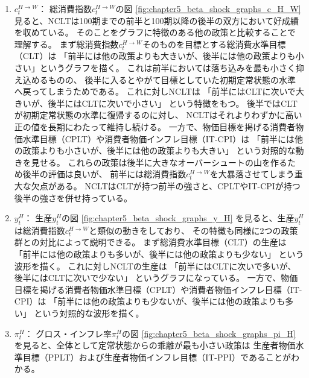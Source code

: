 \begin{enumerate}
    \item
    \label{itm:chapter5_beta_shock_policies_nclt_c_H_W}
        \(c_t^{H\to W}\)：
        総消費指数\(c_t^{H\to W}\)の図
        \ref{fig:chapter5_beta_shock_graphs_c_H_W}
        見ると、NCLTは100期までの前半と100期以降の後半の双方において好成績を収めている。
        そのことをグラフに特徴のある他の政策と比較することで理解する。
        まず総消費指数\(c_t^{H\to W}\)そのものを目標とする総消費水準目標（CLT）は
        「前半には他の政策よりも大きいが、後半には他の政策よりも小さい」というグラフを描く。
        これは前半においては落ち込みを最も小さく抑え込めるものの、
        後半に入るとやがて目標としていた初期定常状態の水準へ戻ってしまうためである。
        これに対しNCLTは
        「前半にはCLTに次いで大きいが、後半にはCLTに次いで小さい」
        という特徴をもつ。
        後半ではCLTが初期定常状態の水準に復帰するのに対し、
        NCLTはそれよりわずかに高い正の値を長期にわたって維持し続ける。
        一方で、物価目標を掲げる消費者物価水準目標（CPLT）や消費者物価インフレ目標（IT-CPI）は
        「前半には他の政策よりも小さいが、後半には他の政策よりも大きい」
        という対照的な動きを見せる。
        これらの政策は後半に大きなオーバーシュートの山を作るため後半の評価は良いが、
        前半には総消費指数\(c_t^{H\to W}\)を大暴落させてしまう重大な欠点がある。
        NCLTはCLTが持つ前半の強さと、CPLTやIT-CPIが持つ後半の強さを併せ持っている。
    \item 
    \label{itm:chapter5_beta_shock_policies_nclt_y_H}
        \(y_t^H\)：
        生産\(y_t^H\)の図
        \ref{fig:chapter5_beta_shock_graphs_y_H}
        を見ると、生産\(y_t^H\)は総消費指数\(c_t^{H\to W}\)と類似の動きをしており、
        その特徴も同様に2つの政策群との対比によって説明できる。
        まず総消費水準目標（CLT）の生産は
        「前半には他の政策よりも多いが、後半には他の政策よりも少ない」
        という波形を描く。
        これに対しNCLTの生産は
        「前半にはCLTに次いで多いが、後半にはCLTに次いで少ない」
        というグラフになっている。
        一方で、物価目標を掲げる消費者物価水準目標（CPLT）や消費者物価インフレ目標（IT-CPI）は
        「前半には他の政策よりも少ないが、後半には他の政策よりも多い」
        という対照的な波形を描く。
    \item 
    \label{itm:chapter5_beta_shock_policies_nclt_pi_H}
        \(\pi_t^H\)：
        グロス・インフレ率\(\pi_t^H\)の図
        \ref{fig:chapter5_beta_shock_graphs_pi_H}
        を見ると、全体として定常状態からの乖離が最も小さい政策は
        生産者物価水準目標（PPLT）および生産者物価インフレ目標（IT-PPI）であることがわかる。

\end{enumerate}
